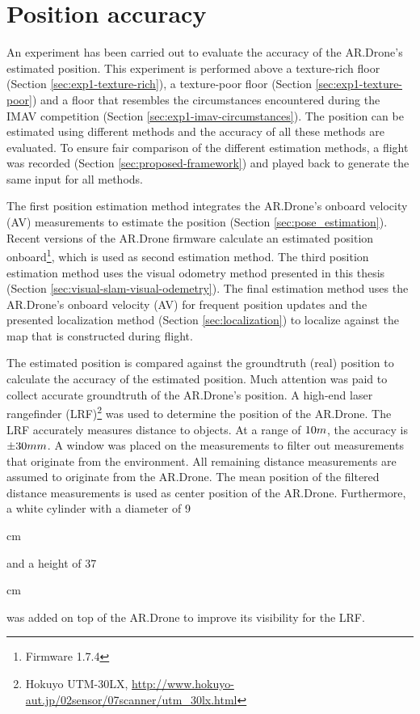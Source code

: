 \section{Position accuracy}
\label{sec:results-position-accuracy}
An experiment has been carried out to evaluate the accuracy of the AR.Drone's estimated position.
This experiment is performed above a texture-rich floor (Section \ref{sec:exp1-texture-rich}), a texture-poor floor (Section \ref{sec:exp1-texture-poor}) and a floor that resembles the circumstances encountered during the IMAV competition (Section \ref{sec:exp1-imav-circumstances}).
The position can be estimated using different methods and the accuracy of all these methods are evaluated.
To ensure fair comparison of the different estimation methods, a flight was recorded (Section \ref{sec:proposed-framework}) and played back to generate the same input for all methods.

The first position estimation method integrates the AR.Drone's onboard velocity (AV) measurements to estimate the position (Section \ref{sec:pose_estimation}).
Recent versions of the AR.Drone firmware calculate an estimated position onboard\footnote{Firmware 1.7.4}, which is used as second estimation method.
The third position estimation method uses the visual odometry method presented in this thesis (Section \ref{sec:visual-slam-visual-odemetry}).
The final estimation method uses the AR.Drone's onboard velocity (AV) for frequent position updates and the presented localization method (Section \ref{sec:localization}) to localize against the map that is constructed during flight.

The estimated position is compared against the groundtruth (real) position to calculate the accuracy of the estimated position.
Much attention was paid to collect accurate groundtruth of the AR.Drone's position.
A high-end laser rangefinder (LRF)\footnote{Hokuyo UTM-30LX, \url{http://www.hokuyo-aut.jp/02sensor/07scanner/utm_30lx.html}} was used to determine the position of the AR.Drone.
The LRF accurately measures distance to objects.
At a range of $10\small{m}$, the accuracy is $\pm30\small{mm}$.
A window was placed on the measurements to filter out measurements that originate from the environment.
All remaining distance measurements are assumed to originate from the AR.Drone.
The mean position of the filtered distance measurements is used as center position of the AR.Drone.
Furthermore, a white cylinder with a diameter of 9\begin{small}cm\end{small} and a height of 37\begin{small}cm\end{small} was added on top of the AR.Drone to improve its visibility for the LRF.

